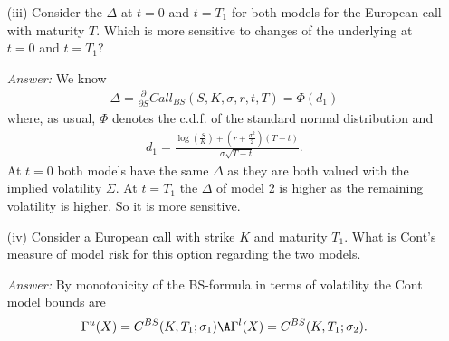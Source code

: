 \documentclass[11pt,a4paper,titlepage]{article}
\begin{document}
\begin{enumerate}
\begin{itemize}
\begin{itemize}
{\it Answer:}
$$
\sigma_1 = \Sigma,
$$
$$
\sigma_2(t) = \sigma_2 \IF_{[0,T_1]}+ \sqrt{\frac{T\Sigma^2 -T_1\sigma_2^2}{T-T_1}}\IF_{]T_1, T]}.
$$
\item[(iii)]
Consider the $\Delta$ at $t=0$ and $t=T_1$ for both models for the European call with maturity $T$. Which is more sensitive to changes of the underlying at $t=0$ and $t=T_1$? 

{\it Answer:}
We know 
\begin{align*}
  \Delta = \frac{\partial}{\partial S}Call_{BS}(S,K,\sigma,r,t,T) = \Phi(d_1)
\end{align*}
where, as usual, $\Phi$ denotes the c.d.f. of the standard normal distribution and
\begin{align*}
  d_1 = \frac{\log \left( \frac{S}{K} \right) + \left( r + \frac{\sigma^2}{2}
  \right)(T-t)}{\sigma \sqrt{T-t}}.
\end{align*}
At $t=0$ both models have the same $\Delta$ as they are both valued with the implied volatility $\Sigma$.
At $t=T_1$ the  $\Delta$ of model 2 is higher as the remaining volatility is higher. So it is more sensitive.  

\item[(iv)]
Consider  a  European call with strike $K$ and maturity $T_1$. What is Cont's measure of model risk for this option regarding the two models. 

{\it Answer:}
By monotonicity of the BS-formula in terms of volatility the Cont model bounds are
$$
\Gamma^u(X)=C^{BS}(K, T_1; \sigma_1)  \A \Gamma^l(X)=C^{BS}(K, T_1; \sigma_2).$$


\end{itemize}
\end{itemize}



\end{enumerate}

\vspace{0.5cm}
\end{document}
